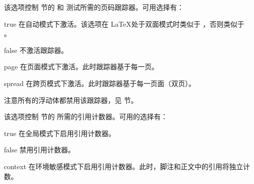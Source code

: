 \begin{optionlist}


该选项控制  节的   和  测试所需的页码跟踪器。可用选择有：

\begin{valuelist}
\item[true] %
在自动模式下激活。该选项在 \LaTeX 处于双面模式时类似于 ，否则类似于 。
\item[false] %
不激活跟踪器。
\item[page] %
在页面模式下激活。此时跟踪器基于每一页。
\item[spread] %
在跨页模式下激活。此时跟踪器基于每一页面（双页）。
\end{valuelist}

注意所有的浮动体都禁用该跟踪器，见  节。


该选项控制  节的  所需的引用计数器。可用的选择有：

\begin{valuelist}
\item[true] %
在全局模式下启用引用计数器。
\item[false] %
禁用引用计数器。
\item[context] %
在环境敏感模式下启用引用计数器。此时，脚注和正文中的引用将独立计数。
\end{valuelist}


\end{optionlist}
